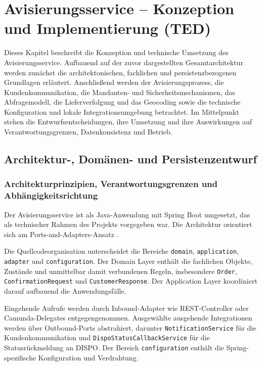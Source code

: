 \section{Avisierungsservice -- Konzeption und Implementierung (TED)}

Dieses Kapitel beschreibt die Konzeption und technische Umsetzung des
Avisierungsservice. Aufbauend auf der zuvor dargestellten Gesamtarchitektur
werden zunächst die architektonischen, fachlichen und persistenzbezogenen
Grundlagen erläutert. Anschließend werden der Avisierungsprozess, die
Kundenkommunikation, die Mandanten- und
Sicherheitsmechanismen, das Abfragemodell, die Lieferverfolgung und das
Geocoding sowie die technische Konfiguration und lokale Integrationsumgebung
betrachtet. Im Mittelpunkt stehen die Entwurfsentscheidungen, ihre Umsetzung
und ihre Auswirkungen auf Verantwortungsgrenzen, Datenkonsistenz und Betrieb.

\subsection{Architektur-, Domänen- und Persistenzentwurf}
\label{sec:architektur-domaenenentwurf}

\subsubsection{Architekturprinzipien, Verantwortungsgrenzen und Abhängigkeitsrichtung}
\label{sec:architekturprinzipien}

Der Avisierungsservice ist als Java-Anwendung mit Spring Boot umgesetzt, das
als technischer Rahmen des Projekts vorgegeben war. Die Architektur orientiert
sich am Ports-and-Adapters-Ansatz \parencite{cockburn2005hexagonal}.

Die Quellcodeorganisation unterscheidet die Bereiche \texttt{domain},
\texttt{application}, \texttt{adapter} und \texttt{configuration}. Der Domain
Layer enthält die fachlichen Objekte, Zustände und unmittelbar damit
verbundenen Regeln, insbesondere \texttt{Order},
\texttt{ConfirmationRequest} und \texttt{CustomerResponse}. Der Application
Layer koordiniert darauf aufbauend die Anwendungsfälle.

Eingehende Aufrufe werden durch Inbound-Adapter wie REST-Controller oder
Camunda-Delegates entgegengenommen. Ausgewählte ausgehende Integrationen werden
über Outbound-Ports abstrahiert, darunter \texttt{NotificationService} für die
Kundenkommunikation und \texttt{Dispo\allowbreak{}Status\allowbreak{}Callback\allowbreak{}Service} für die
Statusrückmeldung an DISPO. Der Bereich \texttt{configuration} enthält die
Spring-spezifische Konfiguration und Verdrahtung.

